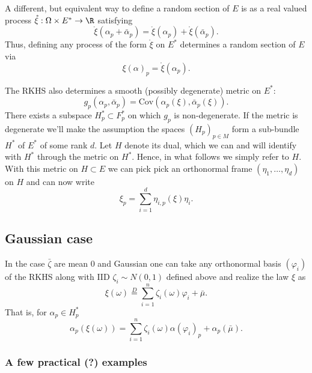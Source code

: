 \documentclass{article}
\newcommand{\randsec}{\xi}
\newcommand{\linprocess}{\mathring{\randsec}}
\newcommand{\meansec}{\bar{\mu}}
\begin{document}
A different, but equivalent way to define a random section of $E$ is as a real valued process $\linprocess:\Omega \times E^* \rightarrow \R$ satisfying
\begin{equation}
  \label{eq:alternate:construction}
\linprocess(\alpha_p + \bar{\alpha}_p) = \linprocess(\alpha_p) + \linprocess(\bar{\alpha}_p).
\end{equation}
Thus, defining any process of the form $\linprocess$ on $E^*$ determines a random section of $E$ via
$$
\randsec(\alpha)_p = \linprocess(\alpha_p).
$$

\newcommand{\ONF}{\eta}

The RKHS also determines a smooth (possibly degenerate) metric on $E^*$:
$$
g_p(\alpha_p, \bar{\alpha}_p) = \text{Cov}(\alpha_p(\randsec), \bar{\alpha}_p(\randsec)).
$$
There exists a subspace $H^*_p \subset F^*_p$ on which $g_p$ is non-degenerate. If the metric
is degenerate we'll make the assumption the spaces $(H_p)_{p \in M}$  form a sub-bundle $H^*$ of $E^*$ of some rank $d$. Let $H$ denote its dual, which we can and will identify with $H^*$ through the metric on $H^*$. Hence,
in what follows we simply refer to $H$.
With this metric on $H \subset E$ we can pick pick an orthonormal frame $(\ONF_1, \dots, \ONF_d)$ on $H$ and can
now write
\begin{equation}
  \label{eq:process:frame}
\randsec_p = \sum_{i=1}^d \ONF_{i,p}(\randsec) \ONF_i.
  \end{equation}

\subsection{Gaussian case}

In the case $\bar{\zeta}$ are mean 0 and Gaussian one can take any orthonormal basis
$(\varphi_i)$ of the RKHS along with IID $\zeta_i \sim N(0,1)$ defined above and realize the law $\randsec$ as
\begin{equation}
  \label{eq:KL}
\randsec(\omega) \overset{D}{=} \sum_{i=1}^n \zeta_i(\omega) \varphi_i + \meansec.
\end{equation}
That is, for $\alpha_p \in H_p^*$
$$
\alpha_p(\randsec(\omega)) = \sum_{i=1}^n \zeta_i(\omega) \alpha(\varphi_i)_p + \alpha_p(\meansec).
$$

\subsubsection{A few practical (?) examples}
\end{document}
